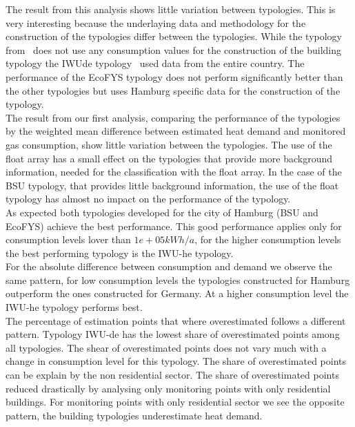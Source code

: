 \documentclass[authoryear,preprint,review,12pt]{elsarticle}
\begin{document}
\begin{linenumbers}
The result from this analysis shows little variation between typologies. This
is very interesting because the underlaying data and methodology for the
construction of the typologies differ between the typologies. While the
typology from~\cite{Blesl.2002} does not use any consumption values for the
construction of the building typology the IWUde typology~\cite{IWU.2003} used
data from the entire country. The performance of the EcoFYS typology does not
perform significantly better than the other typologies but uses Hamburg
specific data for the construction of the typology.\\

The result from our first analysis, comparing the performance of the typologies
by the weighted mean difference between estimated heat demand and monitored gas
consumption, show little variation between the typologies. The use of the float
array has a small effect on the typologies that provide more background
information, needed for the classification with the float array. In the case of
the BSU typology, that provides little background information, the use of the
float typology has almost no impact on the performance of the typology.\\

As expected both typologies developed for the city of Hamburg (BSU and EcoFYS)
achieve the best performance. This good performance applies only for
consumption levels lover than $1e+05 kWh/a$, for the higher consumption levels
the best performing typology is the IWU-he typology.\\ 

For the absolute difference between consumption and demand we observe the same
pattern, for low consumption levels the typologies constructed for Hamburg
outperform the ones constructed for Germany. At a higher consumption level the
IWU-he typology performs best.\\

The percentage of estimation points that where overestimated follows a
different pattern. Typology IWU-de has the lowest share of overestimated points
among all typologies. The shear of overestimated points does not vary much with
a change in consumption level for this typology.
The share of overestimated points can be explain by the non residential sector.
The share of overestimated points reduced drastically by analysing only
monitoring points with only residential buildings. For monitoring points with
only residential sector we see the opposite pattern, the building typologies
underestimate heat demand.\\


\end{linenumbers}
\end{document}

